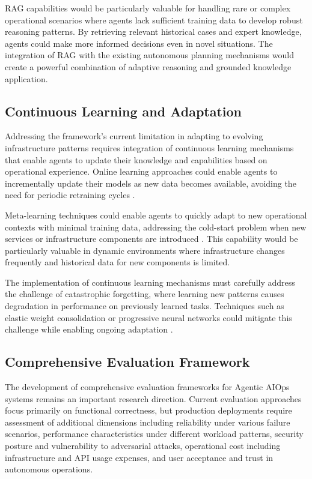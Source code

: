 \documentclass{article}
\begin{document}
RAG capabilities would be particularly valuable for handling rare or complex operational scenarios where agents lack sufficient training data to develop robust reasoning patterns. By retrieving relevant historical cases and expert knowledge, agents could make more informed decisions even in novel situations. The integration of RAG with the existing autonomous planning mechanisms would create a powerful combination of adaptive reasoning and grounded knowledge application.

\subsection{Continuous Learning and Adaptation}

Addressing the framework's current limitation in adapting to evolving infrastructure patterns requires integration of continuous learning mechanisms that enable agents to update their knowledge and capabilities based on operational experience. Online learning approaches could enable agents to incrementally update their models as new data becomes available, avoiding the need for periodic retraining cycles \cite{duan2024}.

Meta-learning techniques could enable agents to quickly adapt to new operational contexts with minimal training data, addressing the cold-start problem when new services or infrastructure components are introduced \cite{duan2024}. This capability would be particularly valuable in dynamic environments where infrastructure changes frequently and historical data for new components is limited.

The implementation of continuous learning mechanisms must carefully address the challenge of catastrophic forgetting, where learning new patterns causes degradation in performance on previously learned tasks. Techniques such as elastic weight consolidation or progressive neural networks could mitigate this challenge while enabling ongoing adaptation \cite{kirkpatrick2017}.

\subsection{Comprehensive Evaluation Framework}

The development of comprehensive evaluation frameworks for Agentic AIOps systems remains an important research direction. Current evaluation approaches focus primarily on functional correctness, but production deployments require assessment of additional dimensions including reliability under various failure scenarios, performance characteristics under different workload patterns, security posture and vulnerability to adversarial attacks, operational cost including infrastructure and API usage expenses, and user acceptance and trust in autonomous operations.
\end{document}
